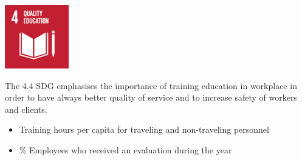 \begin{minipage}[c]{0.2\textwidth}
    \includegraphics[width=\textwidth]{Images/Social_sustainability/4_education.png}
\end{minipage}
\begin{minipage}[c]{0.8\textwidth}
The 4.4 SDG emphasises the importance of training education in workplace in order to have always better quality of service and to increase safety of workers and clients.
\begin{itemize}
    \item Training hours per capita for traveling and non-traveling personnel
    \item \% Employees who received an evaluation during the year
\end{itemize}
\end{minipage}
\hfill

